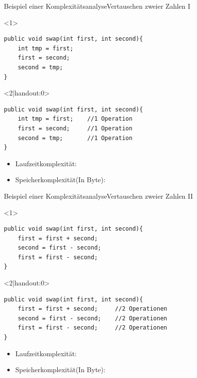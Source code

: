 \begin{frame}[fragile]{Beispiel einer Komplexitätsanalyse}{Vertauschen zweier Zahlen I}
\lstset{style=java}
\begin{onlyenv}<1>
\begin{lstlisting}
public void swap(int first, int second){
    int tmp = first;
    first = second;
    second = tmp;
}
\end{lstlisting}
\end{onlyenv}

\begin{onlyenv}<2|handout:0>
\begin{lstlisting}
public void swap(int first, int second){
    int tmp = first;    //1 Operation
    first = second;     //1 Operation
    second = tmp;       //1 Operation
}
\end{lstlisting}
\end{onlyenv}

\begin{itemize}
    \item Laufzeitkomplexität: 
    \item<4-> Speicherkomplexität(In Byte): 
\end{itemize}
\end{frame}

\begin{frame}[fragile]{Beispiel einer Komplexitätsanalyse}{Vertauschen zweier Zahlen II}
\lstset{style=java}
\begin{onlyenv}<1>
\begin{lstlisting}
public void swap(int first, int second){
    first = first + second;
    second = first - second;
    first = first - second;
}
\end{lstlisting}
\end{onlyenv}
\begin{onlyenv}<2|handout:0>
\begin{lstlisting}
public void swap(int first, int second){
    first = first + second;     //2 Operationen
    second = first - second;    //2 Operationen
    first = first - second;     //2 Operationen
}
\end{lstlisting}
\end{onlyenv}


\begin{itemize}
    \item Laufzeitkomplexität: 
    \item<4-> Speicherkomplexität(In Byte): 
\end{itemize}
\end{frame}

